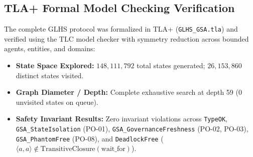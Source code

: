 \documentclass[11pt,a4paper]{article}
\begin{document}
\subsection{TLA+ Formal Model Checking Verification}
The complete GLHS protocol was formalized in TLA+ (\texttt{GLHS\_GSA.tla}) and verified using the TLC model checker with symmetry reduction across bounded agents, entities, and domains:
\begin{itemize}
  \item \textbf{State Space Explored:} $148,111,792$ total states generated; $26,153,860$ distinct states visited.
  \item \textbf{Graph Diameter / Depth:} Complete exhaustive search at depth 59 ($0$ unvisited states on queue).
  \item \textbf{Safety Invariant Results:} Zero invariant violations across \texttt{TypeOK}, \texttt{GSA\_StateIsolation} (PO-01), \texttt{GSA\_GovernanceFreshness} (PO-02, PO-03), \texttt{GSA\_PhantomFree} (PO-08), and \texttt{DeadlockFree} ($\langle a, a \rangle \notin \text{TransitiveClosure}(\text{wait\_for})$).
\end{itemize}
\end{document}
